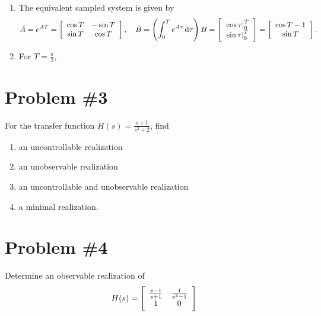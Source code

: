 \documentclass{article}
\begin{document}
\begin{enumerate}
\item{
  The equivalent sampled system is given by
  $$
  \bar{A} = e^{AT} =
  \left[\begin{array}{c c}
    \cos T & -\sin T \\
    \sin T & \cos T
  \end{array}\right], \quad
  \bar{B} = \left(\int_0^T e^{A\tau} \dif\tau\right) B =
  \left[\begin{array}{c}
    \left. \cos \tau \right|_0^T \\
    \left. \sin \tau \right|_0^T
  \end{array}\right] =
  \left[\begin{array}{c}
    \cos T - 1 \\
    \sin T
  \end{array}\right].
  $$
}
\item{
For $T = \frac{\pi}{2}$,
}
\end{enumerate}

\pagebreak

\section*{Problem \#3}
For the transfer function $H(s) = \frac{s+1}{s^2 + 2}$, find
\begin{enumerate}
  \item{
    an uncontrollable realization
  }
  \item{
    an unobservable realization
  }\item{
    an uncontrollable and unobservable realization
  }\item{
    a minimal realization.
  }
\end{enumerate}

\pagebreak

\section*{Problem \#4}
Determine an observable realization of
$$
H(s) =
\left[\begin{array}{c c}
  \frac{s-1}{s+1} & \frac{1}{s^2 - 1} \\
  1               & 0
\end{array}\right]
$$
\end{document}
